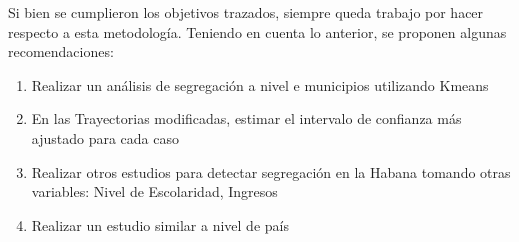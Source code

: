 Si bien se cumplieron los objetivos trazados, siempre queda trabajo por hacer respecto a esta metodología. Teniendo en cuenta lo anterior, se proponen algunas recomendaciones:
\begin{enumerate}
	\item Realizar un análisis de segregación a nivel e municipios utilizando Kmeans
	\item En las Trayectorias modificadas, estimar el intervalo de confianza más ajustado para cada caso
	\item Realizar otros estudios para detectar segregación en la Habana tomando otras variables: Nivel de Escolaridad, Ingresos
	\item Realizar un estudio similar a nivel de país
\end{enumerate}